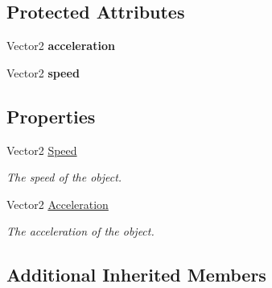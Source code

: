 \subsection*{Protected Attributes}
\begin{DoxyCompactItemize}
\item 
\hypertarget{classwp__engine_1_1_live_object_a754498ab3768aac3a96d378cf933ff24}{Vector2 {\bfseries acceleration}}\label{classwp__engine_1_1_live_object_a754498ab3768aac3a96d378cf933ff24}

\item 
\hypertarget{classwp__engine_1_1_live_object_a3d8e2a3dd8b63bcf09b1009f1533ce47}{Vector2 {\bfseries speed}}\label{classwp__engine_1_1_live_object_a3d8e2a3dd8b63bcf09b1009f1533ce47}

\end{DoxyCompactItemize}
\subsection*{Properties}
\begin{DoxyCompactItemize}
\item 
\hypertarget{classwp__engine_1_1_live_object_af077399d4235fc063fe8bc1f16250adf}{Vector2 \hyperlink{classwp__engine_1_1_live_object_af077399d4235fc063fe8bc1f16250adf}{Speed}}\label{classwp__engine_1_1_live_object_af077399d4235fc063fe8bc1f16250adf}

\begin{DoxyCompactList}\small\item\em The speed of the object. \end{DoxyCompactList}\item 
\hypertarget{classwp__engine_1_1_live_object_a2d29e775cfabd3a3a0de7d50457722f6}{Vector2 \hyperlink{classwp__engine_1_1_live_object_a2d29e775cfabd3a3a0de7d50457722f6}{Acceleration}}\label{classwp__engine_1_1_live_object_a2d29e775cfabd3a3a0de7d50457722f6}

\begin{DoxyCompactList}\small\item\em The acceleration of the object. \end{DoxyCompactList}\end{DoxyCompactItemize}
\subsection*{Additional Inherited Members}


